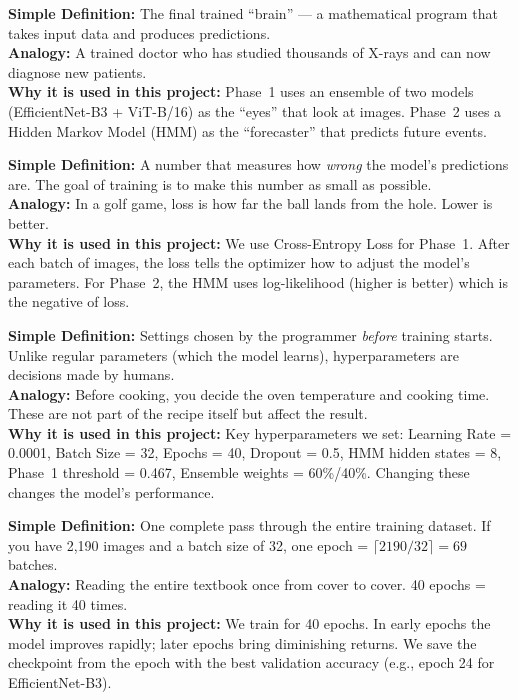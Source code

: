 \documentclass[11pt]{article}
\begin{document}
\begin{description}[style=nextline, leftmargin=1.5cm]

    \item[\textbf{Model}]
    \textbf{Simple Definition:} The final trained ``brain'' --- a mathematical program that takes input data and produces predictions.\\
    \textbf{Analogy:} A trained doctor who has studied thousands of X-rays and can now diagnose new patients.\\
    \textbf{Why it is used in this project:} Phase~1 uses an ensemble of two models (EfficientNet-B3 + ViT-B/16) as the ``eyes'' that look at images. Phase~2 uses a Hidden Markov Model (HMM) as the ``forecaster'' that predicts future events.

    \item[\textbf{Loss}]
    \textbf{Simple Definition:} A number that measures how \emph{wrong} the model's predictions are. The goal of training is to make this number as small as possible.\\
    \textbf{Analogy:} In a golf game, loss is how far the ball lands from the hole. Lower is better.\\
    \textbf{Why it is used in this project:} We use Cross-Entropy Loss for Phase~1. After each batch of images, the loss tells the optimizer how to adjust the model's parameters. For Phase~2, the HMM uses log-likelihood (higher is better) which is the negative of loss.

    \item[\textbf{Hyperparameters}]
    \textbf{Simple Definition:} Settings chosen by the programmer \emph{before} training starts. Unlike regular parameters (which the model learns), hyperparameters are decisions made by humans.\\
    \textbf{Analogy:} Before cooking, you decide the oven temperature and cooking time. These are not part of the recipe itself but affect the result.\\
    \textbf{Why it is used in this project:} Key hyperparameters we set: Learning Rate = 0.0001, Batch Size = 32, Epochs = 40, Dropout = 0.5, HMM hidden states = 8, Phase~1 threshold = 0.467, Ensemble weights = 60\%/40\%. Changing these changes the model's performance.

    \item[\textbf{Epoch}]
    \textbf{Simple Definition:} One complete pass through the entire training dataset. If you have 2,190 images and a batch size of 32, one epoch = $\lceil 2190/32 \rceil = 69$ batches.\\
    \textbf{Analogy:} Reading the entire textbook once from cover to cover. 40 epochs = reading it 40 times.\\
    \textbf{Why it is used in this project:} We train for 40 epochs. In early epochs the model improves rapidly; later epochs bring diminishing returns. We save the checkpoint from the epoch with the best validation accuracy (e.g., epoch 24 for EfficientNet-B3).


\end{description}
\end{document}
